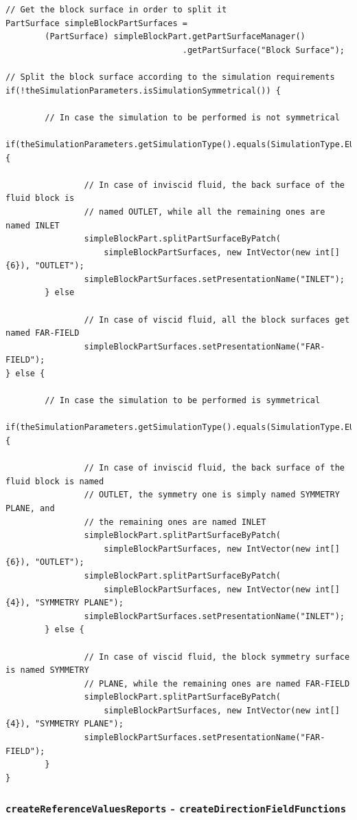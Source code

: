 \begin{lstlisting}[caption={Fluid domain outer surfaces creation and naming operations}, captionpos=b, tabsize=2, label={lst:createFluidDomain01}]
// Get the block surface in order to split it
PartSurface simpleBlockPartSurfaces = 
		(PartSurface) simpleBlockPart.getPartSurfaceManager()
									.getPartSurface("Block Surface");

// Split the block surface according to the simulation requirements		
if(!theSimulationParameters.isSimulationSymmetrical()) {
		
		// In case the simulation to be performed is not symmetrical
		if(theSimulationParameters.getSimulationType().equals(SimulationType.EULER)) {
		
				// In case of inviscid fluid, the back surface of the fluid block is 
				// named OUTLET, while all the remaining ones are named INLET
				simpleBlockPart.splitPartSurfaceByPatch(
					simpleBlockPartSurfaces, new IntVector(new int[] {6}), "OUTLET");
				simpleBlockPartSurfaces.setPresentationName("INLET");
		} else 
		
				// In case of viscid fluid, all the block surfaces get named FAR-FIELD
				simpleBlockPartSurfaces.setPresentationName("FAR-FIELD");
} else {	
		
		// In case the simulation to be performed is symmetrical
		if(theSimulationParameters.getSimulationType().equals(SimulationType.EULER)) {
		
				// In case of inviscid fluid, the back surface of the fluid block is named
				// OUTLET, the symmetry one is simply named SYMMETRY PLANE, and
				// the remaining ones are named INLET
				simpleBlockPart.splitPartSurfaceByPatch(
					simpleBlockPartSurfaces, new IntVector(new int[] {6}), "OUTLET");
				simpleBlockPart.splitPartSurfaceByPatch(
					simpleBlockPartSurfaces, new IntVector(new int[] {4}), "SYMMETRY PLANE");
				simpleBlockPartSurfaces.setPresentationName("INLET");
		} else {
		
				// In case of viscid fluid, the block symmetry surface is named SYMMETRY
				// PLANE, while the remaining ones are named FAR-FIELD
				simpleBlockPart.splitPartSurfaceByPatch(
					simpleBlockPartSurfaces, new IntVector(new int[] {4}), "SYMMETRY PLANE");
				simpleBlockPartSurfaces.setPresentationName("FAR-FIELD");
		}
}
\end{lstlisting}

\subsubsection{\texttt{createReferenceValuesReports} - \texttt{createDirectionFieldFunctions}}

